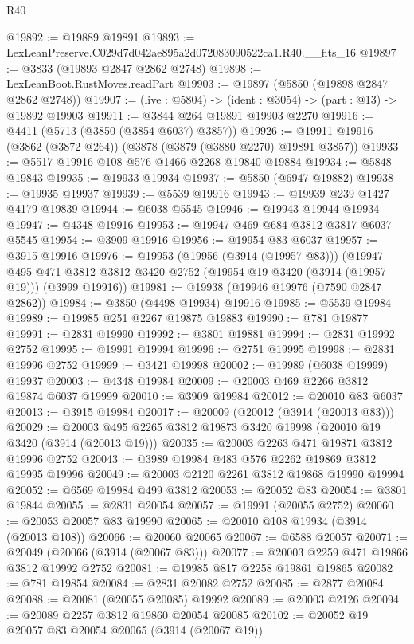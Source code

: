 \begin{lexlean}{R40}
\begin{coremodule}
@19892 := @19889 @19891
@19893 := LexLeanPreserve.C029d7d042ae895a2d072083090522ca1.R40.__fits_16
@19897 := @3833 (@19893 @2847 @2862 @2748)
@19898 := LexLeanBoot.RustMoves.readPart
@19903 := @19897 (@5850 (@19898 @2847 @2862 @2748))
@19907 := (live : @5804) -> (ident : @3054) -> (part : @13) -> @19892 @19903
@19911 := @3844 @264 @19891 @19903 @2270
@19916 := @4411 (@5713 (@3850 (@3854 @6037) @3857))
@19926 := @19911 @19916 (@3862 (@3872 @264)) (@3878 (@3879 (@3880 @2270) @19891 @3857))
@19933 := @5517 @19916 @108 @576 @1466 @2268 @19840 @19884
@19934 := @5848 @19843
@19935 := @19933 @19934
@19937 := @5850 (@6947 @19882)
@19938 := @19935 @19937
@19939 := @5539 @19916
@19943 := @19939 @239 @1427 @4179 @19839
@19944 := @6038 @5545
@19946 := @19943 @19944 @19934
@19947 := @4348 @19916
@19953 := @19947 @469 @684 @3812 @3817 @6037 @5545
@19954 := @3909 @19916
@19956 := @19954 @83 @6037
@19957 := @3915 @19916
@19976 := @19953
    (@19956 (@3914 (@19957 @83)))
    (@19947
      @495
      @471
      @3812
      @3812
      @3420
      @2752
      (@19954 @19 @3420 (@3914 (@19957 @19)))
      (@3999 @19916))
@19981 := @19938 (@19946 @19976 (@7590 @2847 @2862))
@19984 := @3850 (@4498 @19934) @19916
@19985 := @5539 @19984
@19989 := @19985 @251 @2267 @19875 @19883
@19990 := @781 @19877
@19991 := @2831 @19990
@19992 := @3801 @19881
@19994 := @2831 @19992 @2752
@19995 := @19991 @19994
@19996 := @2751 @19995
@19998 := @2831 @19996 @2752
@19999 := @3421 @19998
@20002 := @19989 (@6038 @19999) @19937
@20003 := @4348 @19984
@20009 := @20003 @469 @2266 @3812 @19874 @6037 @19999
@20010 := @3909 @19984
@20012 := @20010 @83 @6037
@20013 := @3915 @19984
@20017 := @20009 (@20012 (@3914 (@20013 @83)))
@20029 := @20003 @495 @2265 @3812 @19873 @3420 @19998 (@20010 @19 @3420 (@3914 (@20013 @19)))
@20035 := @20003 @2263 @471 @19871 @3812 @19996 @2752
@20043 := @3989 @19984 @483 @576 @2262 @19869 @3812 @19995 @19996
@20049 := @20003 @2120 @2261 @3812 @19868 @19990 @19994
@20052 := @6569 @19984 @499 @3812
@20053 := @20052 @83
@20054 := @3801 @19844
@20055 := @2831 @20054
@20057 := @19991 (@20055 @2752)
@20060 := @20053 @20057 @83 @19990
@20065 := @20010 @108 @19934 (@3914 (@20013 @108))
@20066 := @20060 @20065
@20067 := @6588 @20057
@20071 := @20049 (@20066 (@3914 (@20067 @83)))
@20077 := @20003 @2259 @471 @19866 @3812 @19992 @2752
@20081 := @19985 @817 @2258 @19861 @19865
@20082 := @781 @19854
@20084 := @2831 @20082 @2752
@20085 := @2877 @20084
@20088 := @20081 (@20055 @20085) @19992
@20089 := @20003 @2126
@20094 := @20089 @2257 @3812 @19860 @20054 @20085
@20102 := @20052 @19 @20057 @83 @20054 @20065 (@3914 (@20067 @19))

\end{coremodule}
\end{lexlean}

